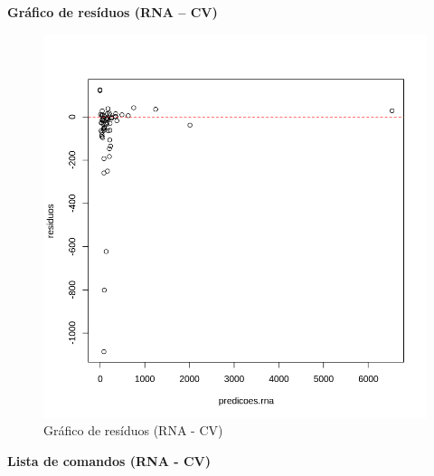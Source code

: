 \begin{center}
    \textbf{Gráfico de resíduos (RNA – CV)}
\end{center}


\begin{figure}[H]
\centering
\caption{Gráfico de resíduos (RNA - CV)}
\includegraphics[width=.8\linewidth]{apendices/fig/8_IAA008_16.png}
\end{figure}



\begin{center}
    \textbf{Lista de comandos (RNA - CV)}
\end{center}



